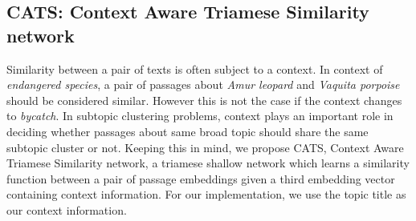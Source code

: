 \documentclass[sigconf,authordraft]{acmart}
\begin{document}
\subsection{CATS: Context Aware Triamese Similarity network}\label{sec:cats} Similarity between a pair of texts is often subject to a context. In context of \textit{endangered species}, a pair of passages about \textit{Amur leopard} and \textit{Vaquita porpoise} should be considered similar. However this is not the case if the context changes to \textit{bycatch}. In subtopic clustering problems, context plays an important role in deciding whether passages about same broad topic should share the same subtopic cluster or not. Keeping this in mind, we propose CATS, Context Aware Triamese Similarity network, a triamese shallow network which learns a similarity function between a pair of passage embeddings given a third embedding vector containing context information. For our implementation, we use the topic title as our context information.
\end{document}
